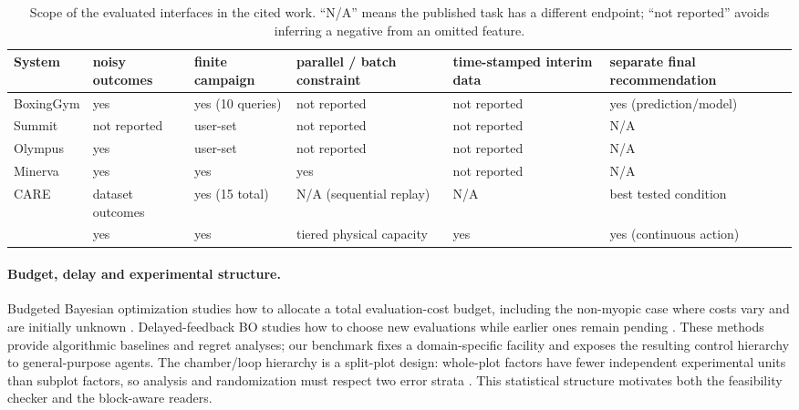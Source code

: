 \begin{table}[t]
\centering\small
\setlength{\tabcolsep}{4pt}
\begin{tabularx}{\textwidth}{@{}l*{5}{>{\centering\arraybackslash}X}@{}}
\toprule
System & noisy outcomes & finite campaign & parallel / batch constraint & time-stamped interim data & separate final recommendation \\
\midrule
BoxingGym & yes & yes (10 queries) & not reported & not reported & yes (prediction/model) \\
Summit & not reported & user-set & not reported & not reported & N/A \\
Olympus & yes & user-set & not reported & not reported & N/A \\
Minerva & yes & yes & yes & not reported & N/A \\
CARE & dataset outcomes & yes (15 total) & N/A (sequential replay) & N/A & best tested condition \\
\slowlab{} & yes & yes & tiered physical capacity & yes & yes (continuous action) \\
\bottomrule
\end{tabularx}
\caption{Scope of the evaluated interfaces in the cited work. ``N/A'' means the published
task has a different endpoint; ``not reported'' avoids inferring a negative from an omitted
feature.}
\label{tab:related-comparison}
\end{table}

\paragraph{Budget, delay and experimental structure.}
Budgeted Bayesian optimization studies how to allocate a total evaluation-cost budget,
including the non-myopic case where costs vary and are initially unknown
\citep{astudillo2021budgeted}. Delayed-feedback BO studies how to choose new evaluations
while earlier ones remain pending \citep{verma2022delayed}. These methods provide algorithmic
baselines and regret analyses; our benchmark fixes a domain-specific facility and exposes
the resulting control hierarchy to general-purpose agents. The chamber/loop hierarchy is a
split-plot design: whole-plot factors have fewer independent experimental units than
subplot factors, so analysis and randomization must respect two error strata
\citep{goos2011splitplot}. This statistical structure motivates both the feasibility checker
and the block-aware readers.


